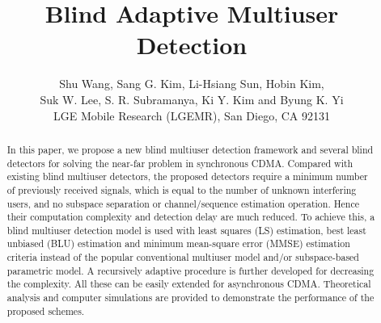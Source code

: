 \documentclass[a4paper,10pt,fleqn, twocolumn]{IEEETran}
\title{Blind Adaptive Multiuser Detection}
\author{Shu Wang, Sang G. Kim, Li-Hsiang Sun, Hobin Kim,\\
   Suk W. Lee, S. R. Subramanya, Ki Y. Kim and Byung K. Yi\\ LGE Mobile Research (LGEMR), San Diego, CA 92131}
\date{}
\begin{document}
\maketitle
\begin{abstract}\small
In this paper, we propose a new blind multiuser detection
framework and several blind detectors for solving the near-far
problem in synchronous CDMA. Compared with existing blind
multiuser detectors, the proposed detectors require a minimum
number of previously received signals, which is equal to the
number of unknown interfering users, and no subspace separation or
channel/sequence estimation operation. Hence their computation
complexity and detection delay are much reduced. To achieve this,
a blind multiuser detection model is used with least squares (LS)
estimation, best least unbiased (BLU) estimation and minimum
mean-square error (MMSE) estimation criteria instead of the
popular conventional multiuser model and/or subspace-based
parametric model. A recursively adaptive procedure is further
developed for decreasing the complexity. All these can be easily
extended for asynchronous CDMA. Theoretical analysis and computer
simulations are provided to demonstrate the performance of the
proposed schemes.
\end{abstract}
\end{document}
